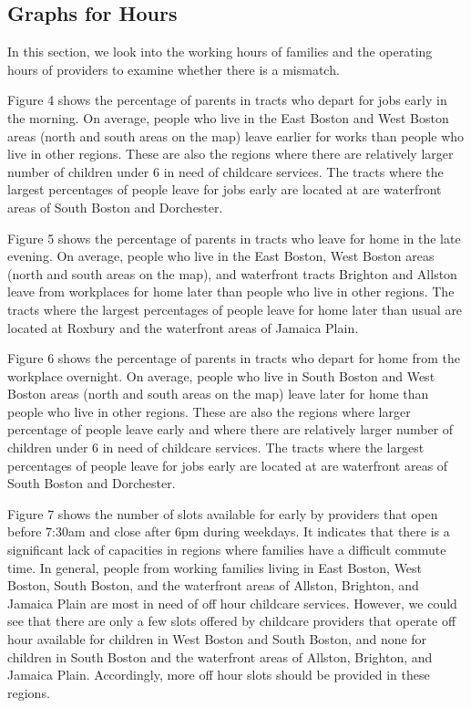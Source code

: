 \documentclass[10pt,letterpaper]{article}
\begin{document}
\subsection{Graphs for Hours}\label{graphs-for-hours}

In this section, we look into the working hours of families and the
operating hours of providers to examine whether there is a mismatch.

Figure 4 shows the percentage of parents in tracts who depart for jobs
early in the morning. On average, people who live in the East Boston and
West Boston areas (north and south areas on the map) leave earlier for
works than people who live in other regions. These are also the regions
where there are relatively larger number of children under 6 in need of
childcare services. The tracts where the largest percentages of people
leave for jobs early are located at are waterfront areas of South Boston
and Dorchester.

Figure 5 shows the percentage of parents in tracts who leave for home in
the late evening. On average, people who live in the East Boston, West
Boston areas (north and south areas on the map), and waterfront tracts
Brighton and Allston leave from workplaces for home later than people
who live in other regions. The tracts where the largest percentages of
people leave for home later than usual are located at Roxbury and the
waterfront areas of Jamaica Plain.

Figure 6 shows the percentage of parents in tracts who depart for home
from the workplace overnight. On average, people who live in South
Boston and West Boston areas (north and south areas on the map) leave
later for home than people who live in other regions. These are also the
regions where larger percentage of people leave early and where there
are relatively larger number of children under 6 in need of childcare
services. The tracts where the largest percentages of people leave for
jobs early are located at are waterfront areas of South Boston and
Dorchester.

Figure 7 shows the number of slots available for early by providers that
open before 7:30am and close after 6pm during weekdays. It indicates
that there is a significant lack of capacities in regions where families
have a difficult commute time. In general, people from working families
living in East Boston, West Boston, South Boston, and the waterfront
areas of Allston, Brighton, and Jamaica Plain are most in need of off
hour childcare services. However, we could see that there are only a few
slots offered by childcare providers that operate off hour available for
children in West Boston and South Boston, and none for children in South
Boston and the waterfront areas of Allston, Brighton, and Jamaica Plain.
Accordingly, more off hour slots should be provided in these regions.
\end{document}

